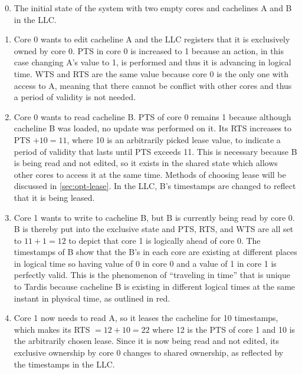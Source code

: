 \documentclass[12pt]{article}
\begin{document}
	
	\begin{enumerate}
		\setcounter{enumi}{-1}
		
		
		
		
		\item The initial state of the system with two empty cores and cachelines A and B in the LLC.
		
		\item Core 0 wants to edit cacheline A and the LLC registers that it is 
		exclusively owned by core 0. PTS in core 0 is increased to 1 because 
		an action, in this case changing A's value to 1, is performed and thus 
		it is advancing in logical time. WTS and RTS are the same value because core 0 is the only one with access to A, meaning that there cannot be conflict with other cores and thus a period of validity is not needed.
		
		\item Core 0 wants to read cacheline B. PTS of core 0 remains 1 because 
		although cacheline B was loaded, no update was performed on it. Its RTS increases to PTS $+ 10 = 11$, where 10 is an 
		arbitrarily picked lease value, to indicate a period of validity that 
		lasts until PTS exceeds 11. This is necessary because B is being read and not edited, so it exists in the shared state which allows other cores to access it at the same time. Methods of choosing lease will be 
		discussed in \cref{sec:opt-lease}. In the LLC, B's timestamps are  
		changed to reflect that it is being leased.
		
		\item Core 1 wants to write to cacheline B, but B is currently being read by core 
		0. B is thereby put into the exclusive state and PTS, RTS, and WTS are all 
		set to $11 + 1 = 12$ to depict that core 1 is logically ahead of core 0.  
		The timestamps of B show that the B's in each core are existing at different 
		places in logical time so having value of 0 in core 0 and 
		a value of 1 in core 1 is perfectly valid. This is the phenomenon of 
		``traveling in time'' that is unique to Tardis because cacheline B is 
		existing in different logical times at the same instant in physical 
		time, as outlined in red.
		
		\item Core 1 now needs to read A, so it leases the cacheline for 10 
		timestamps, which makes its RTS $= 12 + 10 = 22$ where 12 is the PTS of 
		core 1 and 10 is the arbitrarily chosen lease. Since it is now being 
		read and not edited, its exclusive ownership by core 0 changes to 
		shared ownership, as reflected by the timestamps in the LLC.
	\end{enumerate}
	
\end{document}
